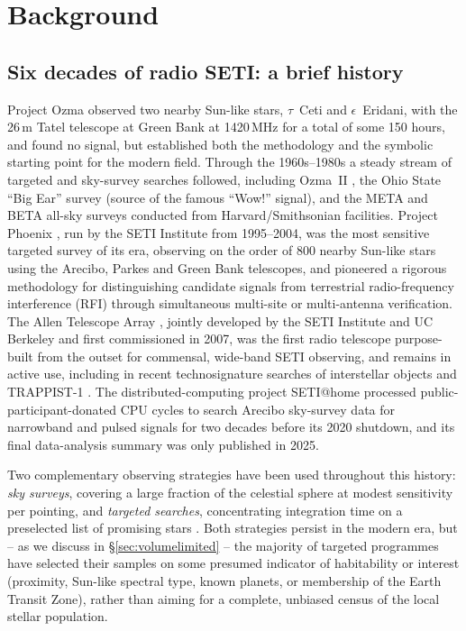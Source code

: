 \documentclass{openjournal}
\begin{document}
\section{Background}
\label{sec:background}

\subsection{Six decades of radio SETI: a brief history}
\label{sec:history}

Project Ozma \citep{Drake1960} observed two nearby Sun-like stars, $\tau$~Ceti and
$\epsilon$~Eridani, with the 26\,m Tatel telescope at Green Bank at 1420\,MHz for
a total of some 150 hours, and found no signal, but established both the
methodology and the symbolic starting point for the modern field. Through the
1960s--1980s a steady stream of targeted and sky-survey searches followed,
including Ozma~II \citep{Drake1986}, the Ohio State ``Big Ear'' survey (source of
the famous ``Wow!'' signal), and the META and BETA all-sky surveys conducted from
Harvard/Smithsonian facilities. Project Phoenix \citep{Backus2002}, run by the
SETI Institute from 1995--2004, was the most sensitive targeted survey of its era,
observing on the order of 800 nearby Sun-like stars using the Arecibo, Parkes and
Green Bank telescopes, and pioneered a rigorous methodology for distinguishing
candidate signals from terrestrial radio-frequency interference (RFI) through
simultaneous multi-site or multi-antenna verification. The Allen Telescope Array
\citep[ATA;][]{Tarter2001}, jointly developed by the SETI Institute and UC
Berkeley and first commissioned in 2007, was the first radio telescope
purpose-built from the outset for commensal, wide-band SETI observing, and remains
in active use, including in recent technosignature searches of interstellar
objects \citep{ATAISO2025} and TRAPPIST-1 \citep{ATATRAPPIST2024}. The
distributed-computing project SETI@home \citep{SETIhome2025} processed
public-participant-donated CPU cycles to search Arecibo sky-survey data for
narrowband and pulsed signals for two decades before its 2020 shutdown, and its
final data-analysis summary was only published in 2025.

Two complementary observing strategies have been used throughout this history:
\emph{sky surveys}, covering a large fraction of the celestial sphere at modest
sensitivity per pointing, and \emph{targeted searches}, concentrating integration
time on a preselected list of promising stars \citep[e.g.][]{Drake1974}. Both
strategies persist in the modern era, but -- as we discuss in
\S\ref{sec:volumelimited} -- the majority of targeted programmes have selected
their samples on some presumed indicator of habitability or interest (proximity,
Sun-like spectral type, known planets, or membership of the Earth Transit Zone),
rather than aiming for a complete, unbiased census of the local stellar
population.
\end{document}
